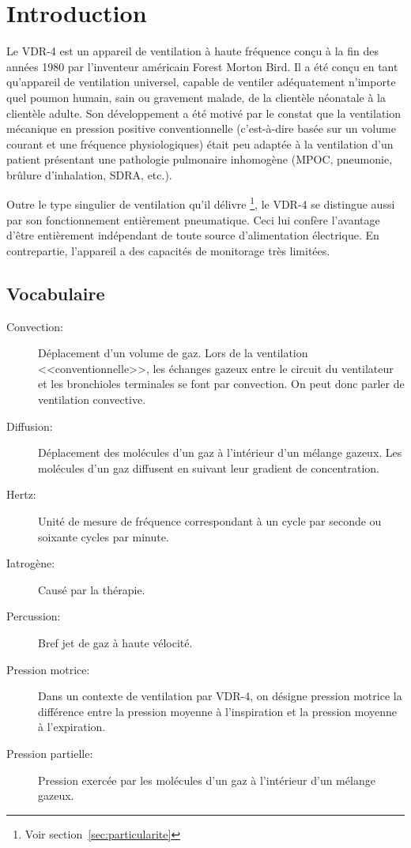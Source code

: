 \chapter{Introduction}

Le VDR-4 est un appareil de ventilation à haute fréquence conçu à la fin des années 1980 par l'inventeur américain Forest Morton Bird. 
Il a été conçu en tant qu'appareil de ventilation universel, capable de ventiler adéquatement n’importe quel poumon humain, sain ou gravement malade, de la clientèle néonatale à la clientèle adulte. 
Son développement a été motivé par le constat que la ventilation mécanique en pression positive conventionnelle (c’est-à-dire basée sur un volume courant et une fréquence physiologiques) était peu adaptée à la ventilation d'un patient présentant une pathologie pulmonaire inhomogène (MPOC, pneumonie, brûlure d’inhalation, SDRA, etc.).

Outre le type singulier de ventilation qu’il délivre \footnote{Voir section~\ref{sec:particularite}}, le VDR-4 se distingue aussi par son fonctionnement entièrement pneumatique. Ceci lui confère l'avantage d’être entièrement indépendant de toute source d'alimentation électrique. En contrepartie, l'appareil a des capacités de monitorage très limitées.

\section{Vocabulaire}

\begin{description}
	\item[Convection:] Déplacement d'un volume de gaz. Lors de la ventilation
	<<conventionnelle>>, les échanges gazeux entre le circuit du ventilateur et
	les bronchioles terminales se font par convection. On peut donc parler de
		ventilation convective\cite{West2017}.  
	\item [Diffusion:] Déplacement des molécules d’un gaz à l’intérieur d’un mélange gazeux. Les molécules d’un gaz diffusent en suivant leur gradient de concentration.
	\item [Hertz:] Unité de mesure de fréquence correspondant à un cycle par seconde ou soixante cycles par minute.
	\item [Iatrogène:] Causé par la thérapie.
	\item [Percussion:] Bref jet de gaz à haute vélocité.
	\item [Pression motrice:] Dans un contexte de ventilation par VDR-4, on désigne pression motrice la différence entre la pression moyenne à l’inspiration et la pression moyenne à l’expiration.
	\item [Pression partielle:] Pression exercée par les molécules d’un gaz à l’intérieur d’un mélange gazeux.
\end{description}

